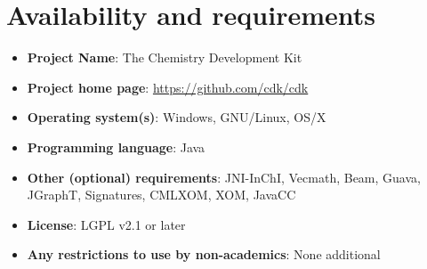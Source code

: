 \documentclass[doublespacing]{bmcart}
\begin{document}
\section*{Availability and requirements}

\begin{itemize}
\item \textbf{Project Name}: The Chemistry Development Kit
\item \textbf{Project home page}: \url{https://github.com/cdk/cdk}
\item \textbf{Operating system(s)}: Windows, GNU/Linux, OS/X
\item \textbf{Programming language}: Java
\item \textbf{Other (optional) requirements}: JNI-InChI, Vecmath, Beam, Guava, JGraphT, Signatures, CMLXOM, XOM, JavaCC
\item \textbf{License}: LGPL v2.1 or later
\item \textbf{Any restrictions to use by non-academics}: None additional
\end{itemize}

\end{document}
